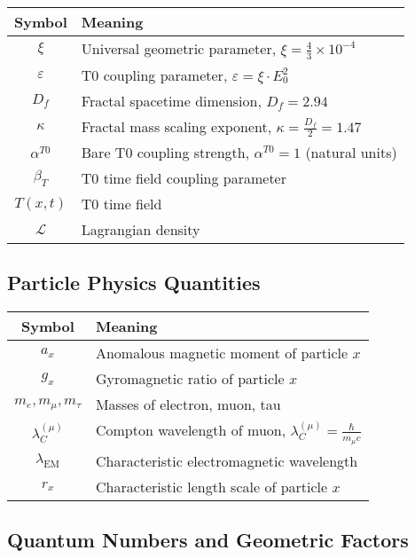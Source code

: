 \documentclass[12pt,a4paper]{article}
\numberwithin{equation}{section}
\newcommand{\xipar}{\xi}
\newcommand{\epsilonT}{\varepsilon}
\newcommand{\alphaT}{\alpha^{T0}}
\newcommand{\kappaT}{\kappa}
\newcommand{\calL}{\mathcal{L}}
\newcommand{\Df}{D_f}
\newcommand{\Eo}{E_0}
\newcommand{\lambdaC}{\lambda_C}
\newcommand{\lambdaEM}{\lambda_{\text{EM}}}
\begin{document}
	\begin{longtable}{cl}
		\toprule
		\textbf{Symbol} & \textbf{Meaning} \\
		\midrule
		$\xipar$ & Universal geometric parameter, $\xipar = \frac{4}{3} \times 10^{-4}$ \\
		$\epsilonT$ & T0 coupling parameter, $\epsilonT = \xipar \cdot \Eo^2$ \\
		$\Df$ & Fractal spacetime dimension, $\Df = 2.94$ \\
		$\kappaT$ & Fractal mass scaling exponent, $\kappaT = \frac{\Df}{2} = 1.47$ \\
		$\alphaT$ & Bare T0 coupling strength, $\alphaT = 1$ (natural units) \\
		$\beta_T$ & T0 time field coupling parameter \\
		$T(x,t)$ & T0 time field \\
		$\calL$ & Lagrangian density \\
		\bottomrule
	\end{longtable}
	
	\subsection{Particle Physics Quantities}
	
	\begin{longtable}{cl}
		\toprule
		\textbf{Symbol} & \textbf{Meaning} \\
		\midrule
		$a_x$ & Anomalous magnetic moment of particle $x$ \\
		$g_x$ & Gyromagnetic ratio of particle $x$ \\
		$m_e, m_\mu, m_\tau$ & Masses of electron, muon, tau \\
		$\lambdaC^{(\mu)}$ & Compton wavelength of muon, $\lambdaC^{(\mu)} = \frac{\hbar}{m_\mu c}$ \\
		$\lambdaEM$ & Characteristic electromagnetic wavelength \\
		$r_x$ & Characteristic length scale of particle $x$ \\
		\bottomrule
	\end{longtable}
	
	\subsection{Quantum Numbers and Geometric Factors}
	
\end{document}
